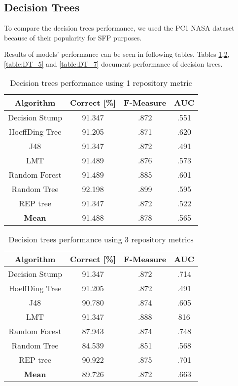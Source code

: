 \subsection{Decision Trees}
To compare the decision trees performance, we used the PC1 NASA dataset because of their popularity for SFP purposes.

Results of models' performance can be seen in following tables. Tables \ref{table:DT_1},\ref{table:DT_3}, \ref{table:DT_5} and \ref{table:DT_7} document performance of decision trees.				


\begin{table}[h!]		
\centering		
\begin{tabular}{ |c|c|c|c| } 		
 \hline		
 \textbf{Algorithm} & \textbf{Correct [\%]} & \textbf{F-Measure} & \textbf{AUC}  \\ 		
 \hline		
 Decision Stump & 91.347 & .872 & .551    \\ 		
 \hline		
 HoeffDing Tree &  91.205 & .871 & .620   \\ 		
 \hline		
  J48 & 91.347 & .872 & .491\\ 		
 \hline		
  LMT & 91.489 & .876 & .573  \\ 		
 \hline		
  Random Forest & 91.489 & .885 & .601 \\ 		
 \hline		
  Random Tree & 92.198 & .899 & .595 \\ 		
 \hline		
 REP tree  & 91.347 & .872 & .522 \\ 		
 \hline		
 \textbf{Mean}  & 91.488 & .878 & .565 \\ 		
 \hline
		
\end{tabular}		
\caption{Decision trees performance using 1 repository metric}		
\label{table:DT_1}		
\end{table}

\begin{table}[h!]		
\centering		
\begin{tabular}{ |c|c|c|c| } 		
 \hline		
 \textbf{Algorithm} & \textbf{Correct [\%]} & \textbf{F-Measure} & \textbf{AUC}  \\ 		
 \hline		
 Decision Stump & 91.347 & .872 & .714    \\ 		
 \hline		
 HoeffDing Tree &  91.205 & .872 & .491   \\ 		
 \hline		
  J48 & 90.780 & .874 & .605\\ 		
 \hline		
  LMT & 91.347 & .888 & 816  \\ 		
 \hline		
  Random Forest & 87.943 & .874 & .748 \\ 		
 \hline		
  Random Tree & 84.539 & .851 & .568 \\ 		
 \hline		
 REP tree  & 90.922 & .875 & .701 \\ 		
 \hline		
 \textbf{Mean}  & 89.726 & .872 & .663 \\ 		
 \hline
		
\end{tabular}		
\caption{Decision trees performance using 3 repository metrics}		
\label{table:DT_3}		
\end{table}

